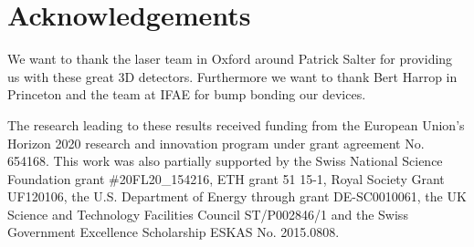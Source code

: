 \section*{Acknowledgements} 
We want to thank the laser team in Oxford around Patrick Salter for providing us with these great 3D detectors. Furthermore we want to thank Bert Harrop in Princeton and the team at IFAE for bump bonding our devices.\par
The research leading to these results received funding from the European Union's Horizon 2020 research and innovation program under grant agreement No. 654168. This work was also partially supported by the Swiss National Science Foundation grant \#20FL20\_154216, ETH grant 51 15-1, Royal Society Grant UF120106, the U.S. Department of Energy through grant DE-SC0010061, the UK Science and Technology Facilities Council ST/P002846/1 and the  Swiss Government Excellence Scholarship ESKAS No. 2015.0808.
